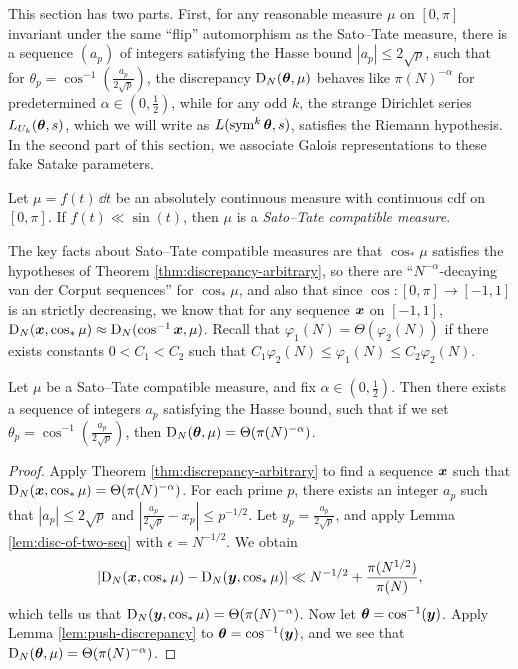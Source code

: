 This section has two parts. First, for any reasonable measure $\mu$ on 
$[0,\pi]$ invariant under the same ``flip'' automorphism as the Sato--Tate 
measure, there is a sequence $(a_p)$ of integers satisfying the Hasse 
bound $|a_p|\leqslant 2\sqrt p$, such that for 
$\theta_p = \cos^{-1}\left(\frac{a_p}{2\sqrt p}\right)$, the discrepancy 
$\operatorname{D}_N({\boldsymbol\theta},\mu)$ behaves like $\pi(N)^{-\alpha}$ for predetermined 
$\alpha\in \left(0,\frac 1 2\right)$, while for any odd $k$, the strange 
Dirichlet series $L_{U_k}({\boldsymbol\theta},s)$, which we will write as 
$L(\operatorname{sym}^k {\boldsymbol\theta},s)$, satisfies the Riemann hypothesis. In the second part of 
this section, we associate Galois representations to these fake Satake 
parameters. 

\begin{definition}
Let $\mu = f(t)\, \dd t$ be an absolutely continuous measure with continuous 
cdf on $[0,\pi]$. If $f(t) \ll \sin(t)$, then $\mu$ is a \emph{Sato--Tate compatible measure}. 
\end{definition}

The key facts about Sato--Tate compatible measures are that $\cos_\ast\mu$ 
satisfies the hypotheses of Theorem \ref{thm:discrepancy-arbitrary}, so 
there are ``$N^{-\alpha}$-decaying van der Corput sequences'' for 
$\cos_\ast\mu$, and also that since $\cos\colon [0,\pi] \to [-1,1]$ is an 
strictly decreasing, we know that for any sequence ${\boldsymbol x}$ on $[-1,1]$, 
$\operatorname{D}_N({\boldsymbol x},\cos_\ast\mu) \approx \operatorname{D}_N(\cos^{-1}{\boldsymbol x},\mu)$. Recall that 
$\varphi_1(N) = \Theta(\varphi_2(N))$ if there exists constants 
$0 < C_1 < C_2$ such that 
$C_1 \varphi_2(N) \leqslant \varphi_1(N) \leqslant C_2 \varphi_2(N)$. 


\begin{theorem}\label{thm:integral-a_p-alpha}
Let $\mu$ be a Sato--Tate compatible measure, and fix 
$\alpha\in \left(0,\frac 1 2\right)$. 
Then there exists a sequence of integers $a_p$ satisfying the Hasse bound, 
such that if we set $\theta_p = \cos^{-1}\left(\frac{a_p}{2\sqrt p}\right)$, 
then $\operatorname{D}_N({\boldsymbol\theta},\mu) = \Theta(\pi(N)^{-\alpha})$. 
\end{theorem}
\begin{proof}
Apply Theorem \ref{thm:discrepancy-arbitrary} to find a sequence ${\boldsymbol x}$ such 
that $\operatorname{D}_N({\boldsymbol x},\cos_\ast \mu) = \Theta(\pi(N)^{-\alpha})$. For each prime 
$p$, there exists an integer $a_p$ such that $|a_p|\leqslant 2\sqrt p$ and 
$\left| \frac{a_p}{2\sqrt p} - x_p\right| \leqslant p^{-1/2}$. Let 
$y_p = \frac{a_p}{2\sqrt p}$, and apply Lemma \ref{lem:disc-of-two-seq} with 
$\epsilon = N^{-1/2}$. We obtain 
\[
	\left| \operatorname{D}_N({\boldsymbol x},\cos_\ast \mu) - \operatorname{D}_N({\boldsymbol y}, \cos_\ast \mu)\right| \ll  N^{-1/2} + \frac{\pi(N^{1/2})}{\pi(N)} ,
\]
which tells us that $\operatorname{D}_N({\boldsymbol y},\cos_\ast\mu) = \Theta(\pi(N)^{-\alpha})$. 
Now let ${\boldsymbol\theta} = \cos^{-1}({\boldsymbol y})$. Apply Lemma \ref{lem:push-discrepancy} to 
${\boldsymbol\theta} = \cos^{-1}({\boldsymbol y})$, and we see that 
$\operatorname{D}_N({\boldsymbol\theta},\mu) = \Theta(\pi(N)^{-\alpha})$. 
\end{proof}

